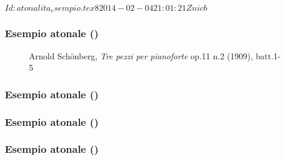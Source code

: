 %
%
\svnInfo $Id: atonalita_esempio.tex 8 2014-02-04 21:01:21Z nicb $

\setcounter{ms}{0}
\begin{frame}
    \frametitle{Esempio atonale ()}

    \begin{center}
        \begin{figure}
            \caption{Arnold Sch\"onberg, \emph{Tre pezzi per pianoforte} op.11 n.2 (1909), batt.1-5}
        \end{figure}
    \end{center}

\end{frame}

\begin{frame}
    \frametitle{Esempio atonale ()}

    \begin{center}
    \end{center}

\end{frame}

\begin{frame}
    \frametitle{Esempio atonale ()}

    \begin{center}
    \end{center}

\end{frame}

\begin{frame}
    \frametitle{Esempio atonale ()}

    \begin{center}
        \\[0.5\baselineskip]
        \\[0.5\baselineskip]
        \\[0.5\baselineskip]
    \end{center}

\end{frame}


